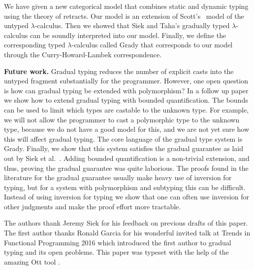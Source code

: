 We have given a new categorical model that combines static and dynamic
typing using the theory of retracts.  Our model is an extension of
Scott's~\cite{Scott:1980} model of the untyped $\lambda$-calculus.
Then we showed that Siek and Taha's gradually typed $\lambda$-calculus
\cite{Siek:2015} can be soundly interpreted into our model.  Finally,
we define the corresponding typed $\lambda$-calculus called Grady that
corresponds to our model through the Curry-Howard-Lambek
correspondence.

\textbf{Future work.}  Gradual typing reduces the number of explicit
casts into the untyped fragment substantially for the programmer.
However, one open question is how can gradual typing be extended with
polymorphism?  In a follow up paper we show how to extend gradual
typing with bounded quantification.  The bounds can be used to limit
which types are castable to the unknown type.  For example, we will
not allow the programmer to cast a polymorphic type to the unknown
type, because we do not have a good model for this, and we are not yet
sure how this will affect gradual typing.  The core language of the
gradual type system is Grady.  Finally, we show that this system
satisfies the gradual guarantee as laid out by Siek et
al.~\cite{Siek:2015}.  Adding bounded quantification is a non-trivial
extension, and thus, proving the gradual guarantee was quite
laborious. The proofs found in the literature for the gradual
guarantee usually make heavy use of inversion for typing, but for a
system with polymorphism and subtyping this can be difficult.  Instead
of using inversion for typing we show that one can often use inversion
for other judgments and make the proof effort more tractable.

\begin{ack}
  The authors thank Jeremy Siek for his feedback on previous drafts of
  this paper.  The first author thanks Ronald Garcia for his wonderful
  invited talk at Trends in Functional Programming 2016 which
  introduced the first author to gradual typing and its open problems.
  This paper was typeset with the help of the amazing Ott tool
  \cite{Sewell:2010}.
\end{ack}
